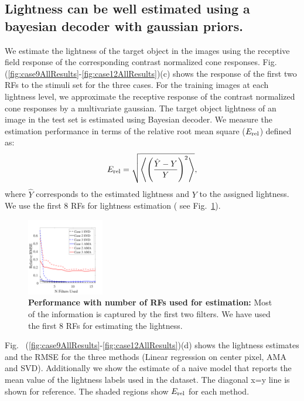 \documentclass{jov}
\begin{document}
\subsection{Lightness can be well estimated using a bayesian decoder with gaussian priors.}
We estimate the lightness of the target object in the images using the receptive field response of the corresponding contrast normalized cone responses. Fig.~ (\ref{fig:case9AllResults}-\ref{fig:case12AllResults})(c) shows the response of the first two RFs to the stimuli set for the three cases. For the training images at each lightness level, we approximate the receptive response of the contrast normalized cone responses by a multivariate gaussian. The target object lightness of an image in the test set is estimated using Bayesian decoder. We measure the estimation performance in terms of the relative root mean square ($E_{\rm rel}$) defined as:
\begin{align}
E_{\rm rel} = \sqrt{\left\langle\left(\frac{\hat{Y}-Y}{Y}\right)^2\right\rangle},
\end{align}
where $\hat{Y}$ corresponds to the estimated lightness and $Y$ to the assigned lightness. We use the first 8 RFs for lightness estimation ( see Fig.~\ref{fig:RMSEvsNFilters}).

\begin{figure}
\centering
\includegraphics[width=0.3\textwidth]{../Figures/Figure5/Figure5.pdf}
\caption{{\bf Performance with number of RFs used for estimation:} Most of the information is captured by the first two filters. We have used the first 8 RFs for estimating the lightness.}
\label{fig:RMSEvsNFilters}
\end{figure}

Fig.~ (\ref{fig:case9AllResults}-\ref{fig:case12AllResults})(d) shows the lightness estimates and the RMSE for the three methods (Linear regression on center pixel, AMA and SVD). Additionally we show the estimate of a naive model that reports the mean value of the lightness labels used in the dataset. The diagonal x=y line is shown for reference. The shaded regions show $E_{\rm rel}$ for each method.
\end{document}
